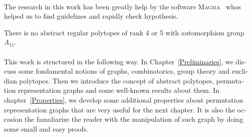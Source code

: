 \begin{otherlanguage}{french}
\paragraph{}
The research in this work has been greatly help by the software \textsc{Magma}~\cite{magma} whos helped us to find guidelines and rapidly check hypothesis.

\begin{theorem}
  There is no abstract regular polytopes of rank 4 or 5 with automorphism group $A_{11}$.
\end{theorem}

\paragraph{}
This work is structured in the following way. In Chapter~\ref{Preliminaries}, we discuss some fondamental notions of graphs, combinatorics, group theory and euclidian polytopes. Then we introduce the concept of abstract polytopes, permutation representation graphs and some well-known results about them. In chapter~\ref{Properties}, we develop some additional properties about permutation representation graphs that are very useful for the next chapter. It is also the occasion the famaliarize the reader with the manipulation of such graph by doing some small and easy proofs.

\paragraph{}


\end{otherlanguage}
